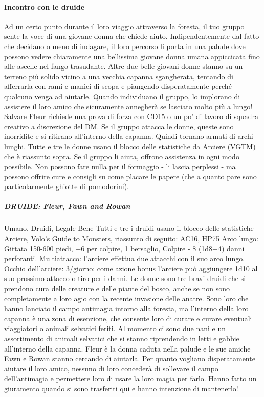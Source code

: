 \documentclass{article}
\begin{document}
\paragraph{Incontro con le druide} Ad un certo punto durante il loro viaggio attraverso la foresta, il tuo gruppo sente la voce di una giovane donna che chiede aiuto. Indipendentemente dal fatto che decidano o meno di indagare, il loro percorso li porta in una palude dove possono vedere chiaramente una bellissima giovane donna umana appiccicata fino alle ascelle nel fango trasudante. Altre due belle giovani donne stanno su un terreno più solido vicino a una vecchia capanna sgangherata, tentando di afferrarla con rami e manici di scopa e piangendo disperatamente perché qualcuno venga ad aiutarle. Quando individuano il gruppo, lo implorano di assistere il loro amico che sicuramente annegherà se lasciato molto più a lungo!
Salvare Fleur richiede una prova di forza con CD15 o un po' di lavoro di squadra creativo a discrezione del DM.
Se il gruppo attacca le donne, queste sono inorridite e si ritirano all'interno della capanna. Quindi tornano armati di archi lunghi. Tutte e tre le donne usano il blocco delle statistiche da Arciere (VGTM) che è riassunto sopra.
Se il gruppo li aiuta, offrono assistenza in ogni modo possibile. Non possono fare nulla per il formaggio - li lascia perplessi
- ma possono offrire cure e consigli su come placare le papere (che a quanto pare sono particolarmente ghiotte di pomodorini).
\subparagraph{DRUIDE: Fleur, Fawn and Rowan} Umano, Druidi, Legale Bene
Tutti e tre i druidi usano il blocco delle statistiche Arciere, Volo's Guide to Monsters, riassunto di seguito:
AC16, HP75
Arco lungo: Gittata 150-600 piedi, +6 per colpire, 1 bersaglio, Colpire - 8 (1d8+4) danni perforanti.
Multiattacco: l'arciere effettua due attacchi con il suo arco lungo.
Occhio dell'arciere: 3/giorno: come azione bonus l'arciere può aggiungere 1d10 al suo prossimo attacco o tiro per i danni.
Le donne sono tre bravi druidi che si prendono cura delle creature e delle piante del bosco, anche se non sono completamente a loro agio con la recente invasione delle anatre. Sono loro che hanno lanciato il campo antimagia intorno alla foresta, ma l'interno della loro capanna è una zona di esenzione, che consente loro di curare e curare eventuali viaggiatori o animali selvatici feriti. Al momento ci sono due nani e un assortimento di animali selvatici che si stanno riprendendo in letti e gabbie all'interno della capanna.
Fleur è la donna caduta nella palude e le sue amiche Fawn e Rowan stanno cercando di aiutarla. Per quanto vogliano disperatamente aiutare il loro amico, nessuno di loro concederà di sollevare il campo dell'antimagia e permettere loro di usare la loro magia per farlo. Hanno fatto un giuramento quando si sono trasferiti qui e hanno intenzione di mantenerlo!
\end{document}
